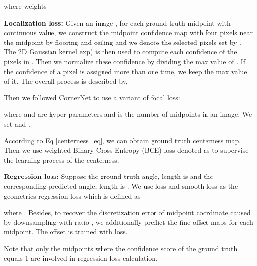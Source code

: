 \documentclass[10pt,twocolumn,letterpaper]{article}
\begin{document}
where weights 

\textbf{Localization loss:} Given an image , for each ground truth midpoint  with continuous value,
we construct the midpoint confidence map  with four pixels near the midpoint by flooring and ceiling and we denote the selected pixels set by . The 2D Gaussian kernel exp) is then used to compute each confidence of the pixels in . Then we normalize these confidence by dividing the max value of . If the confidence of a pixel is assigned more than one time, we keep the max value of it. The overall process is described by,

Then we followed CornerNet\cite{CornerNet} to use a variant of focal loss:

where  and  are hyper-parameters and  is the number of midpoints in an image. We set  and .


 According to Eq \eqref{centerness_eq}, we can obtain ground truth centerness map. Then we use weighted Binary Cross Entropy (BCE) loss denoted as  to supervise the learning process of the centerness.

 
 
\textbf{Regression loss:} Suppose the ground truth angle, length is  and the corresponding predicted angle, length is . We use  loss and smooth  loss as the geometrics regression loss which is defined as


where . Besides, to recover the discretization error of midpoint coordinate caused by downsampling with ratio , we additionally predict the fine offset maps  for each midpoint. The offset is trained with  loss.
\begin{small} 

\end{small}
Note that only the midpoints where the confidence score of the ground truth equals 1 are involved in regression loss calculation.
\end{document}
